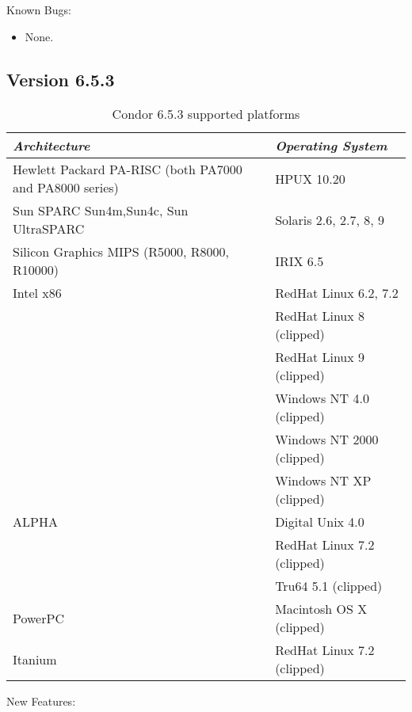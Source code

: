 \noindent Known Bugs:

\begin{itemize}

\item None.

\end{itemize}


\subsection{\label{sec:New-6-5-3}Version 6.5.3}

\begin{center}
\begin{table}[hbt]
\begin{tabular}{|ll|} \hline
\emph{Architecture} & \emph{Operating System} \\ \hline \hline
Hewlett Packard PA-RISC (both PA7000 and PA8000 series) & HPUX 10.20 \\ \hline
Sun SPARC Sun4m,Sun4c, Sun UltraSPARC & Solaris 2.6, 2.7, 8, 9 \\ \hline
Silicon Graphics MIPS (R5000, R8000, R10000) & IRIX 6.5 \\ \hline
Intel x86 & RedHat Linux 6.2, 7.2 \\
 & RedHat Linux 8 (clipped) \\ \hline
 & RedHat Linux 9 (clipped) \\ \hline
 & Windows NT 4.0 (clipped) \\ \hline
 & Windows NT 2000 (clipped) \\ \hline
 & Windows NT XP (clipped) \\ \hline
ALPHA & Digital Unix 4.0 \\
 & RedHat Linux 7.2 (clipped) \\ \hline
 & Tru64 5.1 (clipped) \\ \hline
PowerPC & Macintosh OS X (clipped) \\
Itanium & RedHat Linux 7.2 (clipped) \\
\end{tabular}
\caption{\label{vers-hist-sup-plat}Condor 6.5.3 supported platforms}
\end{table}
\end{center}

\noindent New Features:

